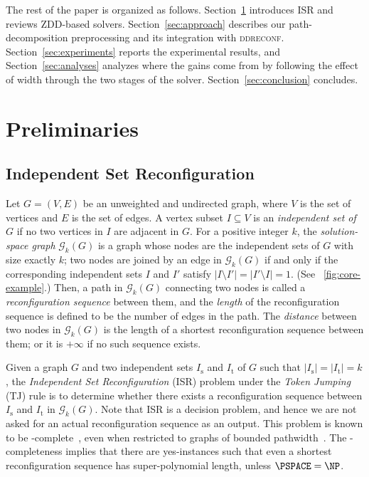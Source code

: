 \documentclass[conference]{IEEEtran}
\newcommand{\ini}{\mathrm{s}}
\newcommand{\tar}{\mathrm{t}}
\newcommand{\solgraph}[2]{\mathcal{G}_{#1}(#2)}
\newcommand{\ISR}{\textsc{ISR}\xspace}
\begin{document}
The rest of the paper is organized as follows. Section~\ref{sec:preliminaries}
introduces \ISR and reviews ZDD-based solvers. Section~\ref{sec:approach} describes
our path-decomposition preprocessing and its integration with \textsc{ddreconf}.
Section~\ref{sec:experiments} reports the experimental results, and
Section~\ref{sec:analyses} analyzes where the gains come from by following the
effect of width through the two stages of the solver.
Section~\ref{sec:conclusion} concludes.


\section{Preliminaries}
\label{sec:preliminaries}

\subsection{Independent Set Reconfiguration}
\label{subsec:isr}

Let $G=(V,E)$ be an unweighted and undirected graph, where $V$ is the set of vertices and $E$ is the set of edges. 
A vertex subset $I\subseteq V$ is an \emph{independent set of $G$} if no two vertices in $I$ are adjacent in $G$.
For a positive integer $k$, the \emph{solution-space graph} $\solgraph{k}{G}$ is a graph whose nodes are the independent sets of $G$ with size exactly $k$; two nodes are joined by an edge in $\solgraph{k}{G}$ if and only if the corresponding independent sets $I$ and $I'$ satisfy $|I \setminus I'| = |I' \setminus I| = 1$. (See \figurename~\ref{fig:core-example}.) 
Then, a path in $\solgraph{k}{G}$ connecting two nodes is called a \emph{reconfiguration sequence} between them, and the \emph{length} of the reconfiguration sequence is defined to be the number of edges in the path. 
The \emph{distance} between two nodes in $\solgraph{k}{G}$ is the length of a shortest reconfiguration sequence between them;
or it is $+\infty$ if no such sequence exists. 

Given a graph $G$ and two independent sets $I_{\ini}$ and $I_{\tar}$ of $G$ such that $|I_{\ini}|=|I_{\tar}| = k$, the \emph{Independent Set Reconfiguration} (\ISR) problem under the \emph{Token Jumping} (TJ) rule is to determine whether there exists a reconfiguration sequence between $I_{\ini}$ and $I_{\tar}$ in $\solgraph{k}{G}$.
Note that \ISR is a decision problem, and hence we are not asked for an actual reconfiguration sequence as an output. 
This problem is known to be \PSPACE-complete~\cite{kamemi12}, even when restricted to graphs of bounded pathwidth~\cite{Wrochna18}.
The \PSPACE-completeness implies that there are yes-instances such that even a
shortest reconfiguration sequence has super-polynomial length, unless $\PSPACE = \NP$.
\end{document}
